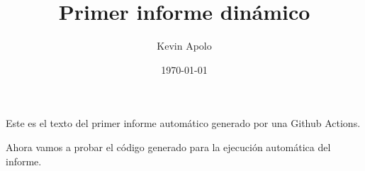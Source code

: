 \documentclass[12pt, a4paper]{book}
\title{Primer informe dinámico}
\author{Kevin Apolo}
\date{\today}
\begin{document}
\maketitle

Este es el texto del primer informe automático generado por una Github Actions. \newline

Ahora vamos a probar el código generado para la ejecución automática del informe.
\end{document}

